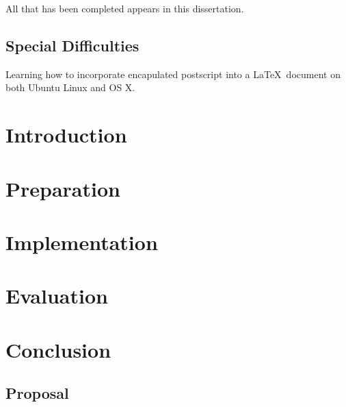 \documentclass[12pt]{report}
\begin{document}
All that has been completed appears in this dissertation.

\section*{Special Difficulties}

Learning how to incorporate encapulated postscript into a \LaTeX\
document on both Ubuntu Linux and OS X.

\tableofcontents

\chapter{Introduction}



\chapter{Preparation} \label{preparation}



\chapter{Implementation} \label{implementation}



\chapter{Evaluation} \label{evaluation}



\chapter{Conclusion}





{}

\begin{appendices}
\chapter{Proposal} \label{proposal}

\end{appendices}
\end{document}
